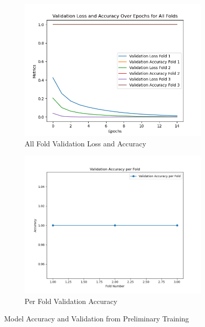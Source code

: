 \documentclass[final, 3p, 11pt]{elsarticle}
\begin{document}
\begin{figure}
        \centering
        \begin{subfigure}[b]{0.505\textwidth}
            \centering
            \includegraphics[width=\textwidth]{Images/validation_loss.png}  %
            \caption{All Fold Validation Loss and Accuracy}
            \label{fig:all_fold_acc}
        \end{subfigure}
        \hfill
        \begin{subfigure}[b]{0.485\textwidth}
            \centering
            \includegraphics[width=\textwidth]{Images/validation_accuracy.png}  %
            \caption{Per Fold Validation Accuracy}
            \label{fig:per_fold_acc}
        \end{subfigure}
        \caption{Model Accuracy and Validation from Preliminary Training}
        \label{fig:model_accurary}
    \end{figure}
\end{document}
